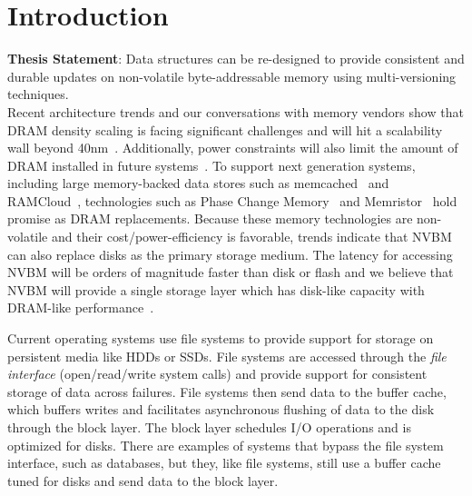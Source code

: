 \chapter{Introduction}
\label{sec:intro}

\textbf{Thesis Statement}: Data structures can be re-designed to provide
consistent and durable updates on non-volatile byte-addressable memory using
multi-versioning techniques.\\

Recent architecture trends and our conversations with memory vendors
show that DRAM density scaling is facing significant challenges and
will hit a scalability wall beyond
40nm~\citep{ITRS07,Mandelman02,Mueller05}.  Additionally, power
constraints will also limit the amount of DRAM installed in future
systems~\citep{Bergman08,Freitas08}.  To support next generation
systems, including large memory-backed data stores such as
memcached~\citep{Fitzpatrick04} and RAMCloud~\citep{Ousterhout09},
technologies such as Phase Change Memory~\citep{Raoux08} and
Memristor~\citep{Strukov08} hold promise as DRAM replacements.
Because these memory technologies are non-volatile and their 
cost/power-efficiency is favorable, trends indicate that NVBM can also
replace disks as the primary storage medium. The latency for accessing
NVBM will be orders of magnitude faster than disk or flash and we 
believe that NVBM will provide a single storage layer which has 
disk-like capacity with DRAM-like performance~\cite{Freitas08}.

Current operating systems use file systems to provide support for
storage on persistent media like HDDs or SSDs.
File systems are accessed through the \textit{file interface}
(open/read/write system calls) and provide support for consistent
storage of data across failures.
File systems then send data to the buffer cache, which buffers writes
and facilitates asynchronous flushing of data to the disk through the
block layer.
The block layer schedules I/O operations and is optimized for disks.
There are examples of systems that bypass the file system interface,
such as databases, but they, like file systems, still use a buffer
cache tuned for disks and send data to the block layer.

